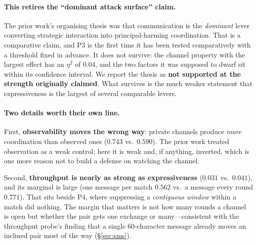 \paragraph{This retires the ``dominant attack surface'' claim.}
The prior work's organising thesis was that communication is the \emph{dominant} lever
converting strategic interaction into principal-harming coordination. That is a
comparative claim, and P3 is the first time it has been tested comparatively with a
threshold fixed in advance. It does not survive: the channel property with the largest
effect has an $\eta^2$ of $0.04$, and the two factors it was supposed to dwarf sit
within its confidence interval. We report the thesis as \textbf{not supported at the
strength originally claimed}. What survives is the much weaker statement that
expressiveness is the largest of several comparable levers.

\paragraph{Two details worth their own line.}
First, \textbf{observability moves the wrong way}: private channels produce \emph{more}
coordination than observed ones ($0.743$ vs.\ $0.590$). The prior work treated
observation as a weak control; here it is weak and, if anything, inverted, which is
one more reason not to build a defense on watching the channel.

Second, \textbf{throughput is nearly as strong as expressiveness} ($0.031$ vs.\
$0.041$), and its marginal is large (one message per match $0.562$ vs.\ a message every
round $0.771$). That sits beside P4, where suppressing a \emph{contiguous window}
within a match did nothing. The margin that matters is not how many rounds a channel is
open but whether the pair gets one exchange or many---consistent with the throughput
probe's finding that a single $60$-character message already moves an
inclined pair most of the way (\S\ref{sec:sms}).

